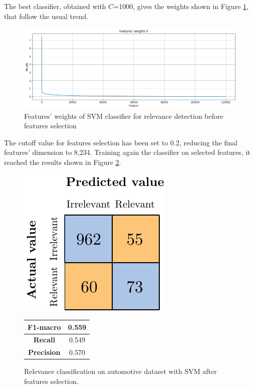 The best classifier, obtained with $C$=1000, gives the weights shown in Figure \ref{fig:ita_rel_svm_fs}, that follow the usual trend.

\begin{figure}[H]
	\centering
	\includegraphics[width=\textwidth]{figures/conf_matrices/ita_rel_svm/ita_rel_svm_fs.png}
	\caption{Features' weights of SVM classifier for relevance detection before features selection}
	\label{fig:ita_rel_svm_fs}
\end{figure}

The cutoff value for features selection has been set to 0.2, reducing the final features' dimension to 8,234. Training again the classifier on selected features, it reached the results shown in Figure \ref{fig:ita_rel_svm_afs}.


\begin{figure}[H]
	\begin{minipage}[b]{0.6\linewidth}
		\centering
	\includegraphics[scale=1]{figures/conf_matrices/ita_rel_svm/ita_rel_svm_afs.pdf}
	\end{minipage}
	\begin{minipage}[b]{0.3\linewidth}
		\begin{tabular}[b]{ | c | c | } 
			\hline
			\textbf{F1-macro} & 0.559 \\
			\hline
			\textbf{Recall} & 0.549 \\ 
			\hline
			\textbf{Precision} & 0.570 \\ 
			\hline
		\end{tabular}
	\end{minipage}
	\caption{Relevance classification on automotive dataset with SVM after features selection.}
	\label{fig:ita_rel_svm_afs}
\end{figure}



